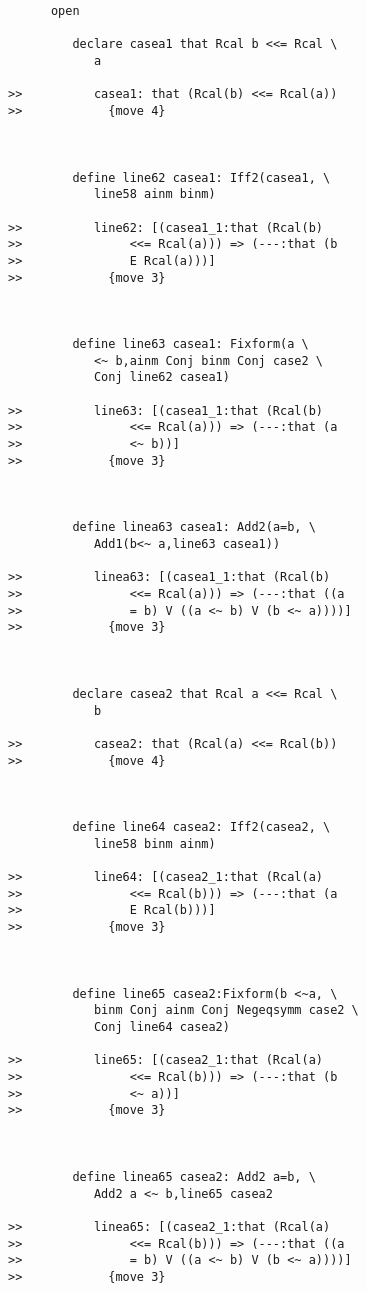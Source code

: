 \documentclass[12pt]{article}
\begin{document}
\begin{verbatim}
      open

         declare casea1 that Rcal b <<= Rcal \
            a

>>          casea1: that (Rcal(b) <<= Rcal(a))
>>            {move 4}



         define line62 casea1: Iff2(casea1, \
            line58 ainm binm)

>>          line62: [(casea1_1:that (Rcal(b)
>>               <<= Rcal(a))) => (---:that (b
>>               E Rcal(a)))]
>>            {move 3}



         define line63 casea1: Fixform(a \
            <~ b,ainm Conj binm Conj case2 \
            Conj line62 casea1)

>>          line63: [(casea1_1:that (Rcal(b)
>>               <<= Rcal(a))) => (---:that (a
>>               <~ b))]
>>            {move 3}



         define linea63 casea1: Add2(a=b, \
            Add1(b<~ a,line63 casea1))

>>          linea63: [(casea1_1:that (Rcal(b)
>>               <<= Rcal(a))) => (---:that ((a
>>               = b) V ((a <~ b) V (b <~ a))))]
>>            {move 3}



         declare casea2 that Rcal a <<= Rcal \
            b

>>          casea2: that (Rcal(a) <<= Rcal(b))
>>            {move 4}



         define line64 casea2: Iff2(casea2, \
            line58 binm ainm)

>>          line64: [(casea2_1:that (Rcal(a)
>>               <<= Rcal(b))) => (---:that (a
>>               E Rcal(b)))]
>>            {move 3}



         define line65 casea2:Fixform(b <~a, \
            binm Conj ainm Conj Negeqsymm case2 \
            Conj line64 casea2)

>>          line65: [(casea2_1:that (Rcal(a)
>>               <<= Rcal(b))) => (---:that (b
>>               <~ a))]
>>            {move 3}



         define linea65 casea2: Add2 a=b, \
            Add2 a <~ b,line65 casea2

>>          linea65: [(casea2_1:that (Rcal(a)
>>               <<= Rcal(b))) => (---:that ((a
>>               = b) V ((a <~ b) V (b <~ a))))]
>>            {move 3}




\end{verbatim}
\end{document}
